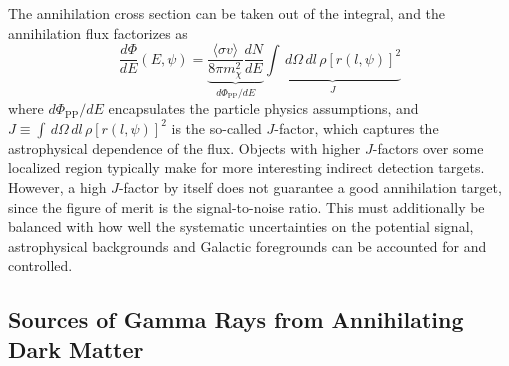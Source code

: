 The annihilation cross section can be taken out of the integral, and the annihilation flux factorizes as %
\begin{equation}
\frac{d\Phi}{dE}(E,\psi) = \underbrace{\frac{\langle\sigma v\rangle}{8\pi m_\chi^2}\frac{dN}{dE}}_{d\Phi_\mathrm{PP}/dE}\underbrace{\int\,d\Omega\,dl\,\rho[r(l,\psi)]^2}_J
\end{equation}
where $d\Phi_\mathrm{PP}/dE$ encapsulates the particle physics assumptions, and $J\equiv\int\,d\Omega\,dl\,\rho[r(l,\psi)]^2$ is the so-called $J$-factor, which captures the astrophysical dependence of the flux. Objects with higher $J$-factors over some localized region typically make for more interesting indirect detection targets. However, a high $J$-factor by itself does not guarantee a good annihilation target, since the figure of merit is the signal-to-noise ratio. This must additionally be balanced with how well the systematic uncertainties on  the potential signal, astrophysical backgrounds and Galactic foregrounds can be accounted for and controlled.

\subsection{Sources of Gamma Rays from Annihilating Dark Matter}
\label{subsec:dmsources}

